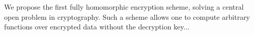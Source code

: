 We propose the first fully homomorphic encryption scheme, solving a central open problem
in cryptography. Such a scheme allows one to compute arbitrary functions over encrypted
data without the decryption key...
